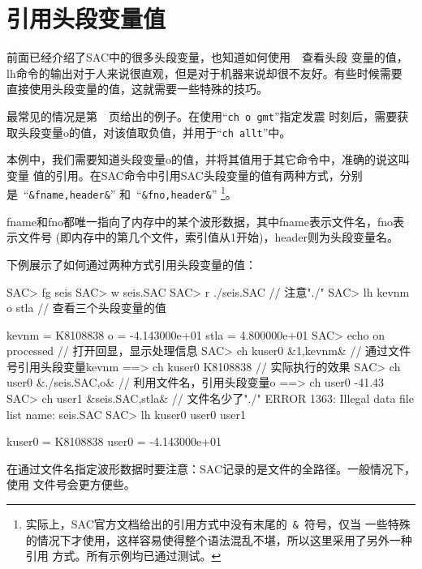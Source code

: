 \section{引用头段变量值}
前面已经介绍了SAC中的很多头段变量，也知道如何使用~~查看头段
变量的值，lh命令的输出对于人来说很直观，但是对于机器来说却很不友好。有些时候需要
直接使用头段变量的值，这就需要一些特殊的技巧。

最常见的情况是第~\pageref{code:origin-time}~页给出的例子。在使用``\verb+ch o gmt+''指定发震
时刻后，需要获取头段变量o的值，对该值取负值，并用于``\verb+ch allt+''中。

本例中，我们需要知道头段变量o的值，并将其值用于其它命令中，准确的说这叫变量
值的引用。在SAC命令中引用SAC头段变量的值有两种方式，分别是~``\verb+&fname,header&+''
和~``\verb+&fno,header&+''
\footnote{实际上，SAC官方文档给出的引用方式中没有末尾的~\verb+&+~符号，仅当
一些特殊的情况下才使用，这样容易使得整个语法混乱不堪，所以这里采用了另外一种引用
方式。所有示例均已通过测试。}。

fname和fno都唯一指向了内存中的某个波形数据，其中fname表示文件名，fno表示文件号
(即内存中的第几个文件，索引值从1开始)，header则为头段变量名。

下例展示了如何通过两种方式引用头段变量的值：
\begin{SACCode}
SAC> fg seis
SAC> w seis.SAC
SAC> r ./seis.SAC               // 注意"./"
SAC> lh kevnm o stla            // 查看三个头段变量的值

     kevnm = K8108838
         o = -4.143000e+01
      stla = 4.800000e+01
SAC> echo on processed          // 打开回显，显示处理信息
SAC> ch kuser0 &1,kevnm&        // 通过文件号引用头段变量kevnm
 ==>  ch kuser0 K8108838        // 实际执行的效果
SAC> ch user0 &./seis.SAC,o&    // 利用文件名，引用头段变量o
 ==>  ch user0 -41.43
SAC> ch user1 &seis.SAC,stla&   // 文件名少了"./"
 ERROR 1363: Illegal data file list name: seis.SAC
SAC> lh kuser0 user0 user1

     kuser0 = K8108838
     user0 = -4.143000e+01
\end{SACCode}

在通过文件名指定波形数据时要注意：SAC记录的是文件的全路径。一般情况下，使用
文件号会更方便些。
